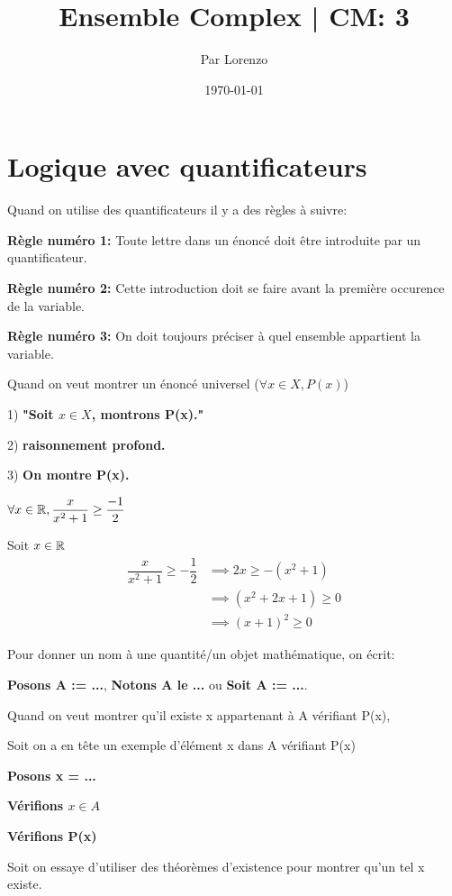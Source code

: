 \documentclass[a4paper, 12pt]{article}
\title{Ensemble Complex | CM: 3}
\author{Par Lorenzo}
\date{\today}
\begin{document}
\maketitle

\section{Logique avec quantificateurs}

Quand on utilise des quantificateurs il y a des règles à suivre:

\textbf{Règle numéro 1:} Toute lettre dans un énoncé doit être introduite par un quantificateur.

\textbf{Règle numéro 2:} Cette introduction doit se faire avant la première occurence de la variable.

\textbf{Règle numéro 3:} On doit toujours préciser à quel ensemble appartient la variable.


\begin{methode}
    Quand on veut montrer un énoncé universel ($\forall x \in X, P(x)$)

    \vspace{0.5em}

    \item 1) \textbf{"Soit $x \in X$, montrons P(x)."}
    \item 2) \textbf{raisonnement profond.}
    \item 3) \textbf{On montre P(x).}
\end{methode}

\begin{example}
    $\forall x \in \mathbb{R}, \dfrac{x}{x^2 + 1} \geq \dfrac{-1}{2}$

    \vspace{1em}

    Soit $x \in \mathbb{R}$
    \begin{align*}
        \dfrac{x}{x^2 + 1} \geq -\dfrac{1}{2} &\implies 2x \geq -(x^2 + 1) \\
        &\implies (x^2 + 2x + 1) \geq 0\\
        &\implies (x + 1)^2 \geq 0
    \end{align*}
\end{example}

Pour donner un nom à une quantité/un objet mathématique, on écrit:

\textbf{Posons A := ...}, \textbf{Notons A le ...} ou \textbf{Soit A := ...}.

\begin{methode}
    Quand on veut montrer qu'il existe x appartenant à A vérifiant P(x),

    Soit on a en tête un exemple d'élément x dans A vérifiant P(x)
    \item \textbf{Posons x = ...}
    \item \textbf{Vérifions $x \in A$}
    \item \textbf{Vérifions P(x)}
    
    Soit on essaye d'utiliser des théorèmes d'existence pour montrer qu'un tel x existe.
\end{methode}
\end{document}

